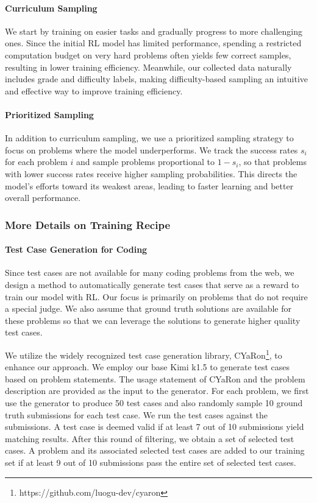 \documentclass{article}
\begin{document}
\paragraph{Curriculum Sampling}
We start by training on easier tasks and gradually progress to more challenging ones. Since the initial RL model has limited performance, spending a restricted computation budget on very hard problems often yields few correct samples, resulting in lower training efficiency. Meanwhile, our collected data naturally includes grade and difficulty labels, making difficulty-based sampling an intuitive and effective way to improve training efficiency.

\paragraph{Prioritized Sampling}
In addition to curriculum sampling, we use a prioritized sampling strategy to focus on problems where the model underperforms. We track the success rates \(s_i\) for each problem \(i\) and sample problems proportional to $1-s_i$, 
so that problems with lower success rates receive higher sampling probabilities. This directs the model’s efforts toward its weakest areas, leading to faster learning and better overall performance.




\subsubsection{More Details on Training Recipe}

\paragraph{Test Case Generation for Coding}

Since test cases are not available for many coding problems from the web, we design a method to automatically generate test cases that serve as a reward to train our model with RL. Our focus is primarily on problems that do not require a special judge. We also assume that ground truth solutions are available for these problems so that we can leverage the solutions to generate higher quality test cases.

We utilize the widely recognized test case generation library, CYaRon\footnote{https://github.com/luogu-dev/cyaron}, to enhance our approach. We employ our base Kimi k1.5 to generate test cases based on problem statements. The usage statement of CYaRon and the problem description are provided as the input to the generator. For each problem, we first use the generator to produce 50 test cases and also randomly sample 10 ground truth submissions for each test case. We run the test cases against the submissions. A test case is deemed valid if at least 7 out of 10 submissions yield matching results. After this round of filtering, we obtain a set of selected test cases. A problem and its associated selected test cases are added to our training set if at least 9 out of 10 submissions pass the entire set of selected test cases.
\end{document}
